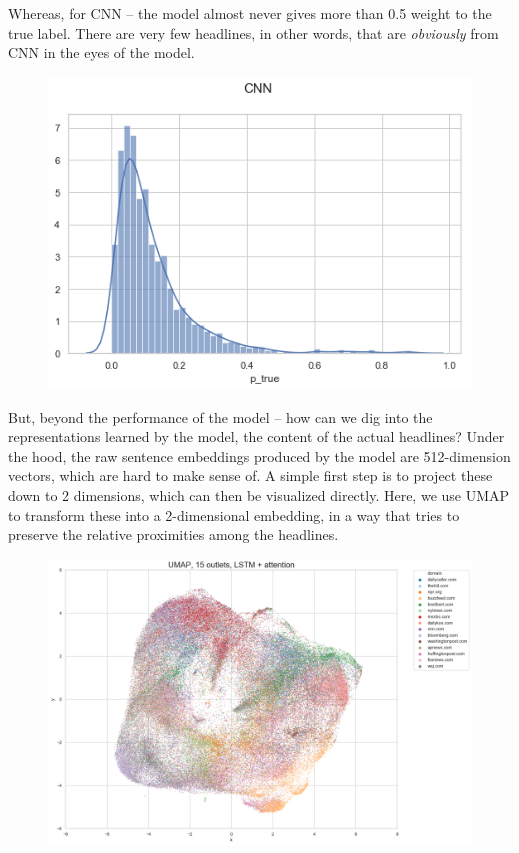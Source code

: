\documentclass{scrartcl}
\begin{document}
Whereas, for CNN -- the model almost never gives more than 0.5 weight to the true label. There are very few headlines, in other words, that are \textit{obviously} from CNN in the eyes of the model.

\begin{figure}[H]
  \centering
  \includegraphics[width=\textwidth]{figures/ptrue-cnn.png}
\end{figure}

But, beyond the performance of the model -- how can we dig into the representations learned by the model, the content of the actual headlines? Under the hood, the raw sentence embeddings produced by the model are 512-dimension vectors, which are hard to make sense of. A simple first step is to project these down to 2 dimensions, which can then be visualized directly. Here, we use UMAP\cite{mcinnes2018umap-software} to transform these into a 2-dimensional embedding, in a way that tries to preserve the relative proximities among the headlines.

\begin{figure}[H]
  \centering
  \includegraphics[height=0.8\textheight]{figures/umap.png}
\end{figure}
\end{document}
